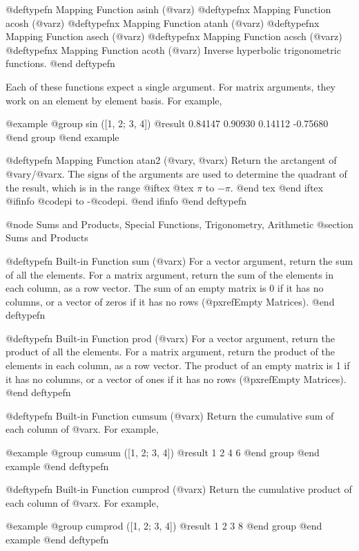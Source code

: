 @deftypefn {Mapping Function} {} asinh (@var{z})
@deftypefnx {Mapping Function} {} acosh (@var{z})
@deftypefnx {Mapping Function} {} atanh (@var{z})
@deftypefnx {Mapping Function} {} asech (@var{z})
@deftypefnx {Mapping Function} {} acsch (@var{z})
@deftypefnx {Mapping Function} {} acoth (@var{z})
Inverse hyperbolic trigonometric functions.
@end deftypefn

Each of these functions expect a single argument.  For matrix arguments,
they work on an element by element basis.  For example,

@example
@group
sin ([1, 2; 3, 4])
     @result{}  0.84147   0.90930
         0.14112  -0.75680
@end group
@end example

@deftypefn {Mapping Function} {} atan2 (@var{y}, @var{x})
Return the arctangent of @var{y}/@var{x}.  The signs of the arguments
are used to determine the quadrant of the result, which is in the range
@iftex
@tex
$\pi$ to $-\pi$.
@end tex
@end iftex
@ifinfo
@code{pi} to -@code{pi}.
@end ifinfo
@end deftypefn

@node Sums and Products, Special Functions, Trigonometry, Arithmetic
@section Sums and Products

@deftypefn {Built-in Function} {} sum (@var{x})
For a vector argument, return the sum of all the elements.  For a matrix
argument, return the sum of the elements in each column, as a row
vector.  The sum of an empty matrix is 0 if it has no columns, or a
vector of zeros if it has no rows (@pxref{Empty Matrices}).
@end deftypefn

@deftypefn {Built-in Function} {} prod (@var{x})
For a vector argument, return the product of all the elements.  For a
matrix argument, return the product of the elements in each column, as a
row vector.  The product of an empty matrix is 1 if it has no columns,
or a vector of ones if it has no rows (@pxref{Empty Matrices}).
@end deftypefn

@deftypefn {Built-in Function} {} cumsum (@var{x})
Return the cumulative sum of each column of @var{x}.  For example,

@example
@group
cumsum ([1, 2; 3, 4])
     @result{}  1  2
         4  6
@end group
@end example
@end deftypefn

@deftypefn {Built-in Function} {} cumprod (@var{x})
Return the cumulative product of each column of @var{x}.  For example,

@example
@group
cumprod ([1, 2; 3, 4])
     @result{}  1  2
         3  8
@end group
@end example
@end deftypefn

